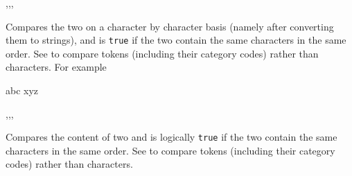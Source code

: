 \documentclass[oneside]{book}
\begin{document}
\begin{function}{\StrIfEq,\StrIfEqT,\StrIfEqF,\StrIfEqTF}
\begin{syntax}
  
   
   
    
\end{syntax}
Compares the two  on a character by character
basis (namely after converting them to strings),
and is \texttt{true} if the two  contain the same
characters in the same order.
See  to compare
tokens (including their category codes) rather than characters.
For example
\begin{demohigh}
 {abc} {} {}
 {xyz} {} {}
\end{demohigh}
\end{function}

\begin{function}{\StrVarIfEq,\StrVarIfEqT,\StrVarIfEqF,\StrVarIfEqTF}
\begin{syntax}
  
   
   
    
\end{syntax}
Compares the content of two  and
is logically \texttt{true} if the two contain the same characters
in the same order.  See  to compare tokens
(including their category codes) rather than characters.
\begin{demohigh}
\StrSet {}
\StrSet {}
\StrSet {}
\StrVarIfEqTF \lTmpaStr {} {}
\StrVarIfEqTF \lTmpaStr {} {}
\end{demohigh}
\end{function}
\end{document}
